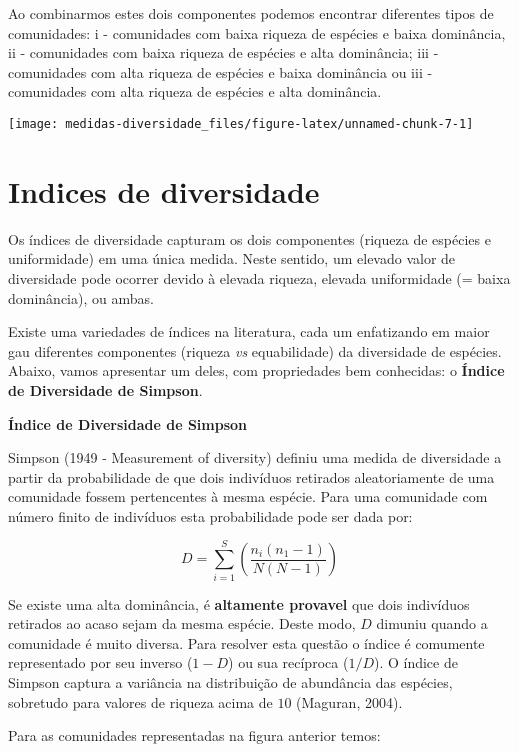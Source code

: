 \documentclass[
]{book}
\begin{document}
Ao combinarmos estes dois componentes podemos encontrar diferentes tipos de comunidades: i - comunidades com baixa riqueza de espécies e baixa dominância, ii - comunidades com baixa riqueza de espécies e alta dominância; iii - comunidades com alta riqueza de espécies e baixa dominância ou iii - comunidades com alta riqueza de espécies e alta dominância.

\begin{center}\texttt{[image: medidas-diversidade\_files/figure-latex/unnamed-chunk-7-1]} \end{center}

\hypertarget{indices-de-diversidade}{%
\section{Indices de diversidade}\label{indices-de-diversidade}}

Os índices de diversidade capturam os dois componentes (riqueza de espécies e uniformidade) em uma única medida. Neste sentido, um elevado valor de diversidade pode ocorrer devido à elevada riqueza, elevada uniformidade (= baixa dominância), ou ambas.

Existe uma variedades de índices na literatura, cada um enfatizando em maior gau diferentes componentes (riqueza \emph{vs} equabilidade) da diversidade de espécies. Abaixo, vamos apresentar um deles, com propriedades bem conhecidas: o \textbf{Índice de Diversidade de Simpson}.

\textbf{Índice de Diversidade de Simpson}

Simpson (1949 - Measurement of diversity) definiu uma medida de diversidade a partir da probabilidade de que dois indivíduos retirados aleatoriamente de uma comunidade fossem pertencentes à mesma espécie. Para uma comunidade com número finito de indivíduos esta probabilidade pode ser dada por:

\[D = \sum_{i = 1}^{S}\left(\frac{n_i(n_1 - 1)}{N(N-1)}\right)\]

Se existe uma alta dominância, é \textbf{altamente provavel} que dois indivíduos retirados ao acaso sejam da mesma espécie. Deste modo, \(D\) dimuniu quando a comunidade é muito diversa. Para resolver esta questão o índice é comumente representado por seu inverso (\(1 - D\)) ou sua recíproca (\(1/D\)). O índice de Simpson captura a variância na distribuição de abundância das espécies, sobretudo para valores de riqueza acima de \(10\) (Maguran, 2004).

Para as comunidades representadas na figura anterior temos:
\end{document}

